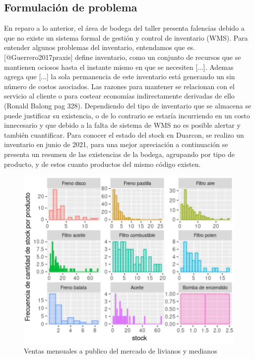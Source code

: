 \documentclass[a4papper,11pt]{article}
\begin{document}
  \subsection{Formulación de problema}
    En reparo a lo anterior, el área de bodega del taller presenta falencias debido a que no existe un sistema formal de gestión y control de inventario (WMS). Para entender algunos problemas del inventario, entendamos que es. [@Guerrero2017praxis] define inventario, como un conjunto de recursos que se mantienen ociosos hasta el instante mismo en que se necesiten [...]. Ademas agrega que [...] la sola permanencia de este inventario está generando un sin número de costos asociados. Las razones para mantener se relacionan con el servicio al cliente o para costear economías indirectamente derivadas de ello (Ronald Balong pag 328). Dependiendo del tipo de inventario que se almacena se puede justificar su existencia, o de lo contrario se estaría incurriendo en un costo innecesario y que debido a la falta de sistema de WMS no es posible alertar y también cuantificar.
    Para conocer el estado del stock en Duarcon, se realizo un inventario en junio de 2021, para una mejor apreciación a continuación se presenta un resumen de las existencias de la bodega, agrupando por tipo de producto, y de estos cuanto productos del mismo código existen.
      \begin{figure}[h]
      \centering
      \includegraphics[width=\textwidth]{inventario.png}
      \caption{Ventas mensuales a publico del mercado de livianos y medianos}
      \label{inventario}
      \end{figure}
    
\end{document}
